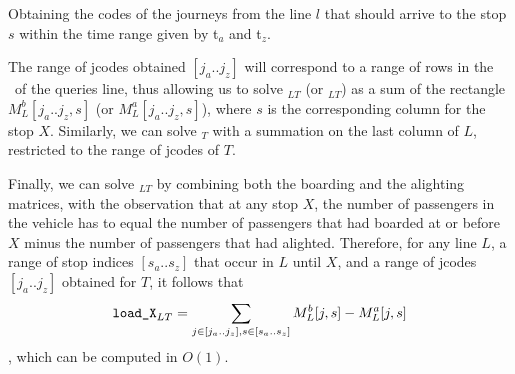     \begin{algorithm}[ht]
     
     
     \caption{Obtaining the codes of the journeys from the line $l$ that should arrive to the stop $s$ within the time range given by t$_a$ and t$_z$.}
     \label{alg:jcodes}
    \end{algorithm}
    
    The range of jcodes obtained $[j_a..j_z]$ will correspond to a range of rows in the \tm~of the queries line, thus allowing us to solve \boardX$_{LT}$ (or \alightX$_{LT}$) as a sum of the rectangle $M^b_L[j_a..j_z, s]$ (or $M^a_L[j_a..j_z, s]$), where $s$ is the corresponding column for the stop $X$. Similarly, we can solve \useL$_T$ with a summation on the last column of $L$, restricted to the range of jcodes of $T$.
    
    Finally, we can solve \loadX$_{LT}$ by combining both the boarding and the alighting matrices, with the observation that at any stop $X$, the number of passengers in the vehicle has to equal the number of passengers that had boarded at or before $X$ minus the number of passengers that had alighted. Therefore, for any line $L$, a range of stop indices $[s_a..s_z]$ that occur in $L$ until $X$, and a range of jcodes $[j_a..j_z]$ obtained for $T$, it follows that 
    \[\texttt{load\_X}_{LT} = \displaystyle\sum_{j \in [j_a..j_z], s \in [s_a..s_z]}M^b_L[j,s] - M^a_L[j,s]\]
    , which can be computed in $O(1)$.
	
